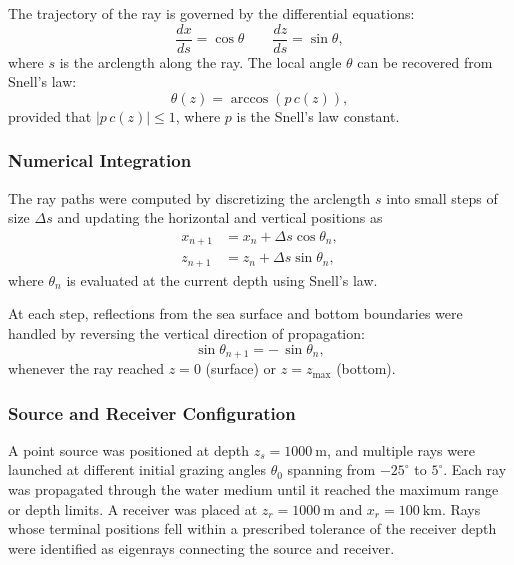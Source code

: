 \documentclass[fleqn]{jaes}
\begin{document}
The trajectory of the ray is governed by the differential equations:
\begin{equation}
    \frac{dx}{ds} = \cos\theta \quad \quad
    \frac{dz}{ds} = \sin\theta,
    \label{eq: dsRelations}
\end{equation}
where $s$ is the arclength along the ray. The local angle $\theta$ can be recovered from Snell’s law:
\begin{equation}
    \theta(z) = \arccos\!\left(p\,c(z)\right),
\label{eq:arccosSnell}
\end{equation}
provided that $|p\,c(z)| \leq 1$, where $p$ is the Snell's law constant.

\subsubsection{Numerical Integration}

The ray paths were computed by discretizing the arclength $s$ into small steps of size $\Delta s$ and updating the horizontal and vertical positions as
\begin{align}
    x_{n+1} &= x_n + \Delta s \cos\theta_n, \\
    z_{n+1} &= z_n + \Delta s \sin\theta_n,
\end{align}
where $\theta_n$ is evaluated at the current depth using Snell’s law. 

At each step, reflections from the sea surface and bottom boundaries were handled by reversing the vertical direction of propagation:
\begin{equation}
    \sin\theta_{n+1} = -\,\sin\theta_n,
    \label{Perfectreflection}
\end{equation}
whenever the ray reached $z = 0$ (surface) or $z = z_{\text{max}}$ (bottom).

\subsubsection{Source and Receiver Configuration}

A point source was positioned at depth $z_s = 1000~\text{m}$, and multiple rays were launched at different initial grazing angles $\theta_0$ spanning from $-25^\circ$ to $5^\circ$. 
Each ray was propagated through the water medium until it reached the maximum range or depth limits. 
A receiver was placed at $z_r = 1000~\text{m}$ and $x_r = 100~\text{km}$. 
Rays whose terminal positions fell within a prescribed tolerance of the receiver depth were identified as eigenrays connecting the source and receiver.
\end{document}
